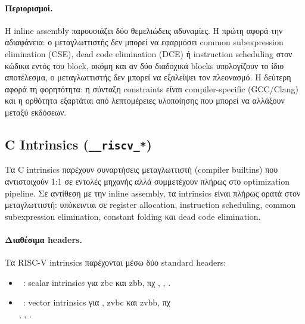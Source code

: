 \paragraph{Περιορισμοί.}
Η inline assembly παρουσιάζει δύο θεμελιώδεις αδυναμίες. Η πρώτη αφορά
την αδιαφάνεια: ο μεταγλωττιστής δεν μπορεί να εφαρμόσει common subexpression
elimination (CSE), dead code elimination (DCE) ή instruction scheduling
στον κώδικα εντός του block, ακόμη και αν δύο διαδοχικά blocks υπολογίζουν
το ίδιο αποτέλεσμα, ο μεταγλωττιστής δεν μπορεί να εξαλείψει τον πλεονασμό. Η
δεύτερη αφορά τη φορητότητα: η σύνταξη constraints είναι compiler-specific
(GCC/Clang) και η ορθότητα εξαρτάται από λεπτομέρειες υλοποίησης που
μπορεί να αλλάξουν μεταξύ εκδόσεων.

\subsection{C Intrinsics (\texttt{\_\_riscv\_*})}
\label{ssec:c-intrinsics}

Τα C intrinsics παρέχουν συναρτήσεις μεταγλωττιστή (compiler builtins) που
αντιστοιχούν 1:1 σε εντολές μηχανής αλλά συμμετέχουν πλήρως στο
optimization pipeline. Σε αντίθεση με την inline assembly, τα intrinsics
είναι πλήρως ορατά στον μεταγλωττιστή: υπόκεινται σε register allocation,
instruction scheduling, common subexpression elimination, constant folding
και dead code elimination.

\paragraph{Διαθέσιμα headers.}
Τα RISC-V intrinsics παρέχονται μέσω δύο standard headers:
\begin{itemize}
  \item {}~\autocite{RISCV-bitmanip-spec}: scalar intrinsics για \gls{zbc} και \gls{zbb},
  πχ ,
    , .
  \item {}~\autocite{RISCV-vector-spec}: vector intrinsics για , \gls{zvbc}
    και \gls{zvbb}, πχ \\ ,
    ,
    .
\end{itemize}

